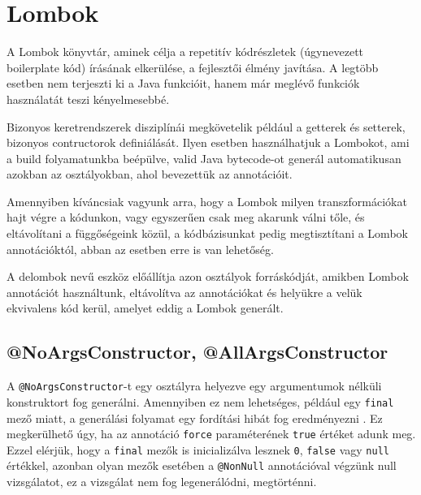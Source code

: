 \section{Lombok}

A Lombok könyvtár, aminek célja a repetitív kódrészletek (úgynevezett boilerplate kód) írásának elkerülése, a fejlesztői élmény javítása. A legtöbb esetben nem terjeszti ki a Java funkcióit, hanem már meglévő funkciók használatát teszi kényelmesebbé. \par

Bizonyos keretrendszerek disziplínái megkövetelik például a getterek és setterek, bizonyos contructorok definiálását. Ilyen esetben használhatjuk a Lombokot, ami a build folyamatunkba beépülve, valid Java bytecode-ot generál automatikusan azokban az osztályokban, ahol bevezettük az annotációit.\par

Amennyiben kíváncsiak vagyunk arra, hogy a Lombok milyen transzformációkat hajt végre a kódunkon, vagy egyszerűen csak meg akarunk válni tőle, és eltávolítani a függőségeink közül, a kódbázisunkat pedig megtisztítani a Lombok annotációktól, abban az esetben erre is van lehetőség. \par

A delombok nevű eszköz előállítja azon osztályok forráskódját, amikben Lombok annotációt használtunk, eltávolítva az annotációkat és helyükre a velük ekvivalens kód kerül, amelyet eddig a Lombok generált. \par


\subsection{@NoArgsConstructor, @AllArgsConstructor}

A \lstinline|@NoArgsConstructor|-t egy osztályra helyezve egy argumentumok nélküli konstruktort fog generálni. Amennyiben ez nem lehetséges, például egy \lstinline|final| mező miatt, a generálási folyamat egy fordítási hibát fog eredményezni \cite{lombokConstructorDocumentation}. Ez megkerülhető úgy, ha az annotáció \lstinline|force| paraméterének \lstinline|true| értéket adunk meg. Ezzel elérjük, hogy a \lstinline|final| mezők is inicializálva lesznek \lstinline|0|, \lstinline|false| vagy \lstinline|null| értékkel, azonban olyan mezők esetében a \lstinline|@NonNull| annotációval végzünk null vizsgálatot, ez a vizsgálat nem fog legenerálódni, megtörténni. \par


